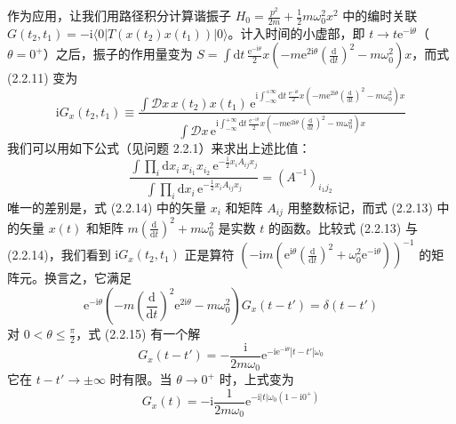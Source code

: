 作为应用，让我们用路径积分计算谐振子 $H_0=\frac{p^2}{2m}+\frac{1}{2}m\omega_0^2x^2$ 中的编时关联 $G(t_2,t_1)=-\mathrm{i}\langle 0|T(x(t_2)x(t_1))|0\rangle$。计入时间的小虚部，即 $t\to t\mathrm{e}^{-\mathrm{i}\theta}$（$\theta=0^+$）之后，振子的作用量变为 $S=\int\mathrm{d}t\,\frac{\mathrm{e}^{-\mathrm{i}\theta}}{2}x\left(-m\mathrm{e}^{2\mathrm{i}\theta}\left(\frac{\mathrm{d}}{\mathrm{d}t}\right)^2-m\omega_0^2\right)x$，而式 (2.2.11) 变为
\begin{equation*}
\mathrm{i}G_x(t_2,t_1)\equiv\frac{\int\mathcal{D}x\,x(t_2)x(t_1)\,\mathrm{e}^{\mathrm{i}\int_{-\infty}^{+\infty}\mathrm{d}t\,\frac{\mathrm{e}^{-\mathrm{i}\theta}}{2}x\left(-m\mathrm{e}^{2\mathrm{i}\theta}\left(\frac{\mathrm{d}}{\mathrm{d}t}\right)^2-m\omega_0^2\right)x}}{\int\mathcal{D}x\,\mathrm{e}^{\mathrm{i}\int_{-\infty}^{+\infty}\mathrm{d}t\,\frac{\mathrm{e}^{-\mathrm{i}\theta}}{2}x\left(-m\mathrm{e}^{2\mathrm{i}\theta}\left(\frac{\mathrm{d}}{\mathrm{d}t}\right)^2-m\omega_0^2\right)x}}\tag{2.2.13}
\end{equation*}
我们可以用如下公式（见问题 2.2.1）来求出上述比值：
\begin{equation*}
\frac{\int\prod_i\mathrm{d}x_i\,x_{i_1}x_{i_2}\,\mathrm{e}^{-\frac{1}{2}x_iA_{ij}x_j}}{\int\prod_i\mathrm{d}x_i\,\mathrm{e}^{-\frac{1}{2}x_iA_{ij}x_j}}=(A^{-1})_{i_1j_2}\tag{2.2.14}
\end{equation*}
唯一的差别是，式 (2.2.14) 中的矢量 $x_i$ 和矩阵 $A_{ij}$ 用整数标记，而式 (2.2.13) 中的矢量 $x(t)$ 和矩阵 $m\left(\frac{\mathrm{d}}{\mathrm{d}t}\right)^2+m\omega_0^2$ 是实数 $t$ 的函数。比较式 (2.2.13) 与 (2.2.14)，我们看到 $\mathrm{i}G_x(t_2,t_1)$ 正是算符 $\left(-\mathrm{i}m\left(\mathrm{e}^{\mathrm{i}\theta}\left(\frac{\mathrm{d}}{\mathrm{d}t}\right)^2+\omega_0^2\mathrm{e}^{-\mathrm{i}\theta}\right)\right)^{-1}$ 的矩阵元。换言之，它满足
\begin{equation*}
\mathrm{e}^{-\mathrm{i}\theta}\left(-m\left(\frac{\mathrm{d}}{\mathrm{d}t}\right)^2\mathrm{e}^{2\mathrm{i}\theta}-m\omega_0^2\right)G_x(t-t')=\delta(t-t')\tag{2.2.15}
\end{equation*}
对 $0<\theta\leqslant\frac{\pi}{2}$，式 (2.2.15) 有一个解
\begin{equation*}
G_x(t-t')=-\frac{\mathrm{i}}{2m\omega_0}\mathrm{e}^{-\mathrm{i}\mathrm{e}^{-\mathrm{i}\theta}|t-t'|\omega_0}
\end{equation*}
它在 $t-t'\to\pm\infty$ 时有限。当 $\theta\to 0^+$ 时，上式变为
\begin{equation*}
G_x(t)=-\mathrm{i}\frac{1}{2m\omega_0}\mathrm{e}^{-\mathrm{i}|t|\omega_0(1-\mathrm{i}0^+)}\tag{2.2.16}
\end{equation*}
